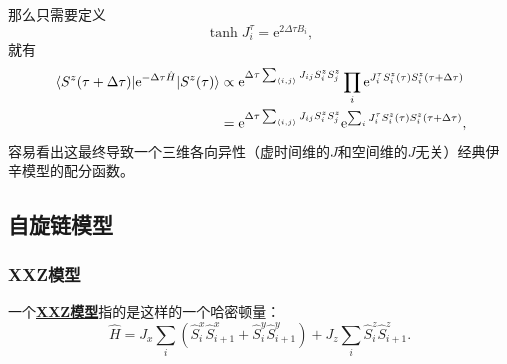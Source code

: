 \documentclass[hyperref, UTF8, a4paper]{ctexart}
\newcommand*{\ee}{\mathrm{e}}
\newcommand*{\pair}[1]{\langle #1 \rangle}
\newcommand*{\concept}[1]{\underline{\textbf{#1}}}
\begin{document}
那么只需要定义
\begin{equation}
    \tanh J^\tau_i = \ee^{2 \Delta \tau B_i}, 
\end{equation}
就有
\[
    \begin{aligned}
        \mel{S^z(\tau + \Delta \tau)}{\ee^{-\Delta \tau \hat{H}}}{S^z(\tau)} &\propto \ee^{\Delta \tau \sum_{\pair{i, j}} J_{ij} S_i^z S_j^z} \prod_i \ee^{J_i^\tau S_i^z(\tau) S_i^z(\tau + \Delta \tau)} \\
        &= \ee^{\Delta \tau \sum_{\pair{i, j}} J_{ij} S_i^z S_j^z} \ee^{\sum_i J_i^\tau S_i^z(\tau) S_i^z(\tau + \Delta \tau)},
    \end{aligned}
\]
容易看出这最终导致一个三维各向异性（虚时间维的$J$和空间维的$J$无关）经典伊辛模型的配分函数。

\subsection{自旋链模型}

\subsubsection{XXZ模型}

一个\concept{XXZ模型}指的是这样的一个哈密顿量：
\begin{equation}
    \hat{H} = J_x \sum_i (\hat{S}_{i}^x \hat{S}_{i+1}^x + \hat{S}_{i}^y \hat{S}_{i+1}^y) + J_z \sum_{i} \hat{S}_i^z \hat{S}_{i+1}^z.
\end{equation}
\end{document}
